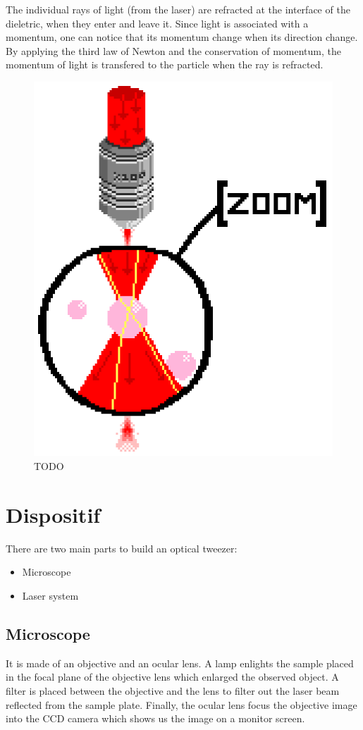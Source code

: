 \documentclass[a4paper,12pt,twoside]{article}	%
\begin{document}
The individual rays of light (from the laser) are refracted at the interface of the dieletric, when they enter and leave it.
Since light is associated with a momentum, one can notice that its momentum change when its direction change.
By applying the third law of Newton and the conservation of momentum, the momentum of light is transfered to the particle when the ray is refracted.


\begin{figure}[h]
	\begin{center}
	\includegraphics[width=0.5\linewidth,angle=0]{./figures/lazor_zoom}
	\caption{TODO} \label{fig:theory}
	\end{center}
\end{figure}

\section{Dispositif}
There are two main parts to build an optical tweezer:
\begin{itemize}
	\item Microscope
	\item Laser system
\end{itemize}

\subsection{Microscope}
It is made of an objective and an ocular lens. A lamp enlights the sample placed in the focal plane of the objective lens which enlarged the observed object. A filter is placed between the objective and the lens to filter out the laser beam reflected from the sample plate. Finally, the ocular lens focus the objective image into the CCD camera which shows us the image on a monitor screen.
\end{document}
